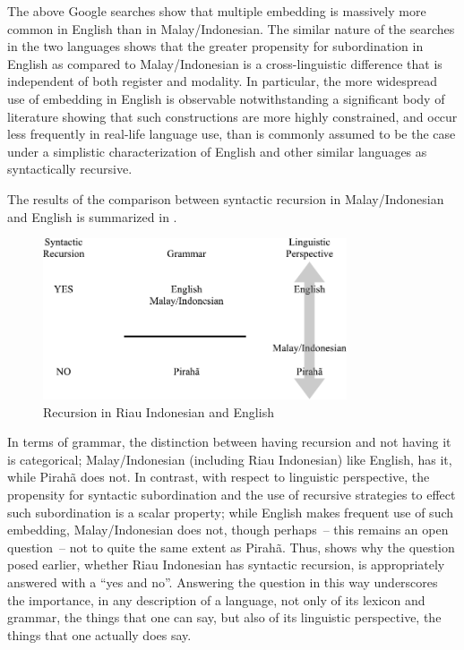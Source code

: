 \documentclass[output=paper]{langscibook}
\begin{document}
The above Google searches show that multiple embedding is massively more common in English than in Malay\slash Indonesian.  The similar nature of the searches in the two languages shows that the greater propensity for subordination in English as compared to Malay\slash Indonesian is  a cross-linguistic difference that is independent of both register and modality.  In particular, the more widespread use of embedding in English is observable notwithstanding a significant body of literature \citep{karlsson2007aconstraints,karlsson2007bconstraints,karlsson2009aorigin,karlsson2009bsyntactic} showing that such constructions are more highly constrained, and occur less frequently in real-life language use, than is commonly assumed to be the case under a simplistic characterization of English and other similar languages as syntactically recursive.

\begin{sloppypar}
The results of the comparison between syntactic recursion in Malay\slash Indonesian and English is summarized in .
\end{sloppypar}

\begin{figure}
\includegraphics[width=0.8\textwidth]{gil_figure5.pdf}
\caption{\label{fig:gil:fig5}Recursion in Riau Indonesian and English}
\end{figure}

In terms of grammar, the distinction between having recursion and not having it is categorical; Malay\slash Indonesian (including Riau Indonesian) like English, has it, while Pirahã does not.  In contrast, with respect to linguistic perspective, the propensity for syntactic subordination and the use of recursive strategies to effect such subordination is a scalar property; while English makes frequent use of such embedding, Malay\slash Indonesian does not, though perhaps~– this remains an open question~– not to quite the same extent as Pirahã.  Thus,  shows why the question posed earlier, whether Riau Indonesian has syntactic recursion, is appropriately answered with a ``yes and no''.  Answering the question in this way underscores the importance, in any description of a language, not only of its lexicon and grammar, the things that one can say, but also of its linguistic perspective, the things that one actually does say.
\end{document}
